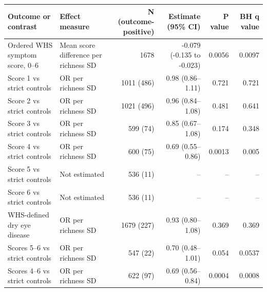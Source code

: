 \begin{tabular}{>{\raggedright\arraybackslash}p{}>{\raggedright\arraybackslash}p{}rrrr}
\toprule
Outcome or contrast & Effect measure & N (outcome-positive) & Estimate (95\% CI) & P value & BH q value \\
\midrule
Ordered WHS symptom score, 0--6 & Mean score difference per richness SD & 1678 & -0.079 (-0.135 to -0.023) & 0.0056 & 0.0097 \\
Score 1 vs strict controls & OR per richness SD & 1011 (486) & 0.98 (0.86--1.11) & 0.721 & 0.721 \\
Score 2 vs strict controls & OR per richness SD & 1021 (496) & 0.96 (0.84--1.08) & 0.481 & 0.641 \\
Score 3 vs strict controls & OR per richness SD & 599 (74) & 0.85 (0.67--1.08) & 0.174 & 0.348 \\
Score 4 vs strict controls & OR per richness SD & 600 (75) & 0.69 (0.55--0.86) & 0.0013 & 0.005 \\
Score 5 vs strict controls & Not estimated & 536 (11) & -- & -- & -- \\
Score 6 vs strict controls & Not estimated & 536 (11) & -- & -- & -- \\
WHS-defined dry eye disease & OR per richness SD & 1679 (227) & 0.93 (0.80--1.08) & 0.369 & 0.369 \\
Scores 5--6 vs strict controls & OR per richness SD & 547 (22) & 0.70 (0.48--1.01) & 0.054 & 0.0537 \\
Scores 4--6 vs strict controls & OR per richness SD & 622 (97) & 0.69 (0.56--0.84) & 0.0004 & 0.0008 \\
\bottomrule
\end{tabular}
